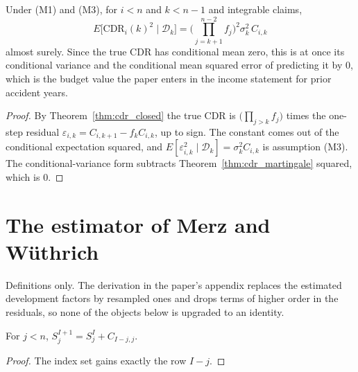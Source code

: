 \begin{theorem}\label{thm:cdr_msep_exact}\leanok
{}
Under (M1) and (M3), for $i < n$ and $k < n-1$ and integrable claims,
\[
  E\big[\mathrm{CDR}_i(k)^2 \mid \mathcal{D}_k\big]
   = \Big(\prod_{j=k+1}^{n-2} f_j\Big)^2 \sigma_k^2\, C_{i,k}
\]
almost surely. Since the true CDR has conditional mean zero, this is at once its conditional
variance and the conditional mean squared error of predicting it by $0$, which is the budget value
the paper enters in the income statement for prior accident years.
\end{theorem}
\begin{proof}\leanok
By Theorem~\ref{thm:cdr_closed} the true CDR is $\big(\prod_{j>k} f_j\big)$ times the one-step
residual $\varepsilon_{i,k} = C_{i,k+1} - f_k C_{i,k}$, up to sign. The constant comes out of the
conditional expectation squared, and $E[\varepsilon_{i,k}^2 \mid \mathcal{D}_k] = \sigma_k^2 C_{i,k}$
is assumption (M3). The conditional-variance form subtracts
Theorem~\ref{thm:cdr_martingale} squared, which is $0$.
\end{proof}

\section{The estimator of Merz and Wüthrich}

Definitions only. The derivation in the paper's appendix replaces the estimated development factors
by resampled ones and drops terms of higher order in the residuals, so none of the objects below is
upgraded to an identity.

\begin{lemma}\label{lem:S_succ}\leanok
{}
For $j < n$, $S^{I+1}_j = S^I_j + C_{I-j,j}$.
\end{lemma}
\begin{proof}\leanok The index set gains exactly the row $I-j$. \end{proof}

